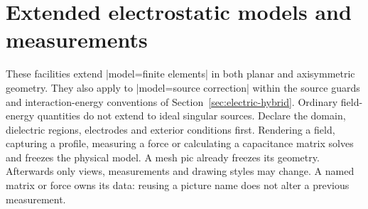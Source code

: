 \section{Extended electrostatic models and measurements}
\label{sec:electric-extended}

These facilities extend |model=finite elements| in both planar and
axisymmetric geometry. They also apply to |model=source correction| within
the source guards and interaction-energy conventions of
Section~\ref{sec:electric-hybrid}. Ordinary field-energy quantities do not
extend to ideal singular sources. Declare the domain, dielectric regions, electrodes
and exterior conditions first. Rendering a field, capturing a profile,
measuring a force or calculating a capacitance matrix solves and freezes the
physical model. A mesh pic already freezes its geometry. Afterwards only
views, measurements and drawing styles may change. A named matrix or force
owns its data: reusing a picture name does not alter a previous measurement.

